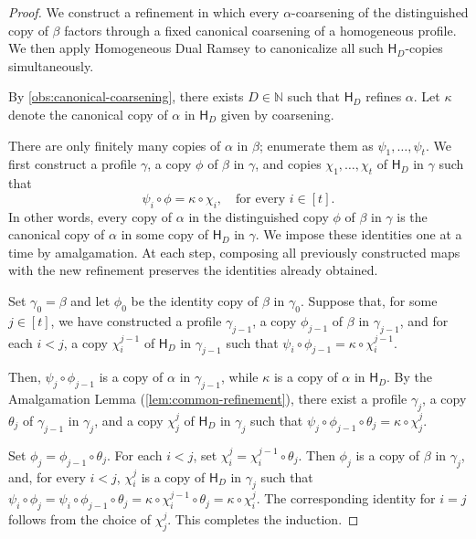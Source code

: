 \documentclass[11pt]{article}
\newcommand{\unif}[1]{\mathsf H_{#1}}
\theoremstyle{remark}
\begin{document}
\begin{proof}
We construct a refinement in which every $\alpha$-coarsening of the distinguished copy of $\beta$ factors through a fixed canonical coarsening of a homogeneous profile.  
We then apply Homogeneous Dual Ramsey to canonicalize all such $\unif{D}$-copies simultaneously.

By \cref{obs:canonical-coarsening}, there exists $D \in \mathbb{N}$ such that $\unif{D}$ refines $\alpha$.
Let $\kappa$ denote the canonical copy of $\alpha$ in $\unif{D}$ given by coarsening.

There are only finitely many copies of $\alpha$ in $\beta$; enumerate them as $\psi_1,\ldots,\psi_t$. 
We first construct a profile $\gamma$, a copy $\phi$ of $\beta$ in $\gamma$, and copies $\chi_1,\ldots,\chi_t$ of $\unif{D}$ in $\gamma$ such that \[\psi_i\circ\phi=\kappa\circ\chi_i, \quad \text{for every $i\in[t]$}.\] 
In other words, every copy of $\alpha$ in the distinguished copy $\phi$ of $\beta$ in $\gamma$ is the canonical copy of $\alpha$ in some copy of $\unif{D}$ in $\gamma$.
We impose these identities one at a time by amalgamation. 
At each step, composing all previously constructed maps with the new refinement preserves the identities already obtained.

Set $\gamma_0=\beta$ and let $\phi_0$ be the identity copy of $\beta$ in $\gamma_0$. 
Suppose that, for some $j\in[t]$, we have constructed a profile $\gamma_{j-1}$, a copy $\phi_{j-1}$ of $\beta$ in $\gamma_{j-1}$, and for each $i<j$, a copy $\chi_i^{j-1}$ of $\unif{D}$ in $\gamma_{j-1}$ such that $\psi_i\circ\phi_{j-1}=\kappa\circ\chi_i^{j-1}$.

Then, $\psi_j\circ\phi_{j-1}$ is a copy of $\alpha$ in $\gamma_{j-1}$, while $\kappa$ is a copy of $\alpha$ in $\unif{D}$. 
By the Amalgamation Lemma (\cref{lem:common-refinement}), there exist a profile $\gamma_j$, a copy $\theta_j$ of $\gamma_{j-1}$ in $\gamma_j$, and a copy $\chi_j^j$ of $\unif{D}$ in $\gamma_j$ such that $\psi_j\circ\phi_{j-1}\circ\theta_j=\kappa\circ\chi_j^j$.

Set $\phi_j=\phi_{j-1}\circ\theta_j$. 
For each $i<j$, set $\chi_i^j=\chi_i^{j-1}\circ\theta_j$. 
Then $\phi_j$ is a copy of $\beta$ in $\gamma_j$, and, for every $i<j$, $\chi_i^j$ is a copy of $\unif{D}$ in $\gamma_j$ such that $\psi_i\circ\phi_j=\psi_i\circ\phi_{j-1}\circ\theta_j=\kappa\circ\chi_i^{j-1}\circ\theta_j=\kappa\circ\chi_i^j$. 
The corresponding identity for $i=j$ follows from the choice of $\chi_j^j$. 
This completes the induction.


\end{proof}
\end{document}
